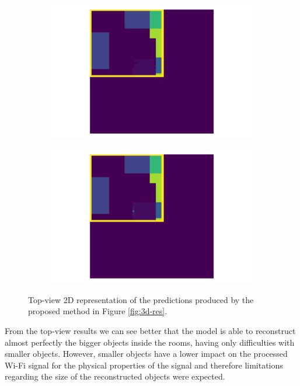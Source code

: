 \documentclass[binding=0.6cm,noexaminfo]{sapthesis}
\begin{document}
\begin{figure}[h!]
\begin{subfigure}{.49\textwidth}
	\centering
	\includegraphics[width=.90\linewidth]{results/top_pred_3}
	\caption{}
\end{subfigure}
\begin{subfigure}{.49\textwidth}
	\centering
	\includegraphics[width=.90\linewidth]{results/top_true_3}
	\caption{}
\end{subfigure}

\caption{Top-view 2D representation of the predictions produced by the proposed method in Figure \ref{fig:3d-res}.}
\label{fig:2d-res}
\end{figure}

From the top-view results we can see better that the model is able to reconstruct almost perfectly the bigger objects inside the rooms, having only difficulties with smaller objects. However, smaller objects have a lower impact on the processed Wi-Fi signal for the physical properties of the signal and therefore limitations regarding the size of the reconstructed objects were expected.
\end{document}
